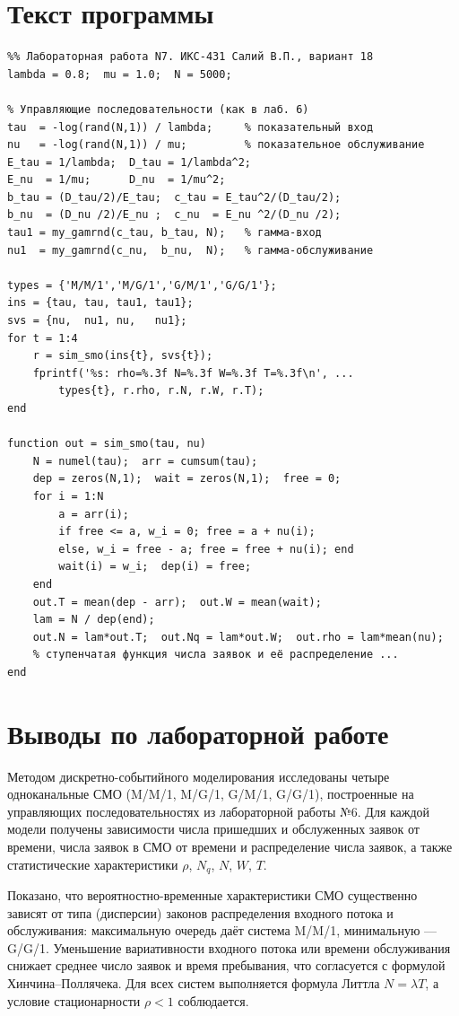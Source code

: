 \documentclass[a4paper,14pt,oneside,openany]{memoir}
\begin{document}
\section{Текст программы}
\begin{verbatim}
%% Лабораторная работа N7. ИКС-431 Салий В.П., вариант 18
lambda = 0.8;  mu = 1.0;  N = 5000;

% Управляющие последовательности (как в лаб. 6)
tau  = -log(rand(N,1)) / lambda;     % показательный вход
nu   = -log(rand(N,1)) / mu;         % показательное обслуживание
E_tau = 1/lambda;  D_tau = 1/lambda^2;
E_nu  = 1/mu;      D_nu  = 1/mu^2;
b_tau = (D_tau/2)/E_tau;  c_tau = E_tau^2/(D_tau/2);
b_nu  = (D_nu /2)/E_nu ;  c_nu  = E_nu ^2/(D_nu /2);
tau1 = my_gamrnd(c_tau, b_tau, N);   % гамма-вход
nu1  = my_gamrnd(c_nu,  b_nu,  N);   % гамма-обслуживание

types = {'M/M/1','M/G/1','G/M/1','G/G/1'};
ins = {tau, tau, tau1, tau1};
svs = {nu,  nu1, nu,   nu1};
for t = 1:4
    r = sim_smo(ins{t}, svs{t});
    fprintf('%s: rho=%.3f N=%.3f W=%.3f T=%.3f\n', ...
        types{t}, r.rho, r.N, r.W, r.T);
end

function out = sim_smo(tau, nu)
    N = numel(tau);  arr = cumsum(tau);
    dep = zeros(N,1);  wait = zeros(N,1);  free = 0;
    for i = 1:N
        a = arr(i);
        if free <= a, w_i = 0; free = a + nu(i);
        else, w_i = free - a; free = free + nu(i); end
        wait(i) = w_i;  dep(i) = free;
    end
    out.T = mean(dep - arr);  out.W = mean(wait);
    lam = N / dep(end);
    out.N = lam*out.T;  out.Nq = lam*out.W;  out.rho = lam*mean(nu);
    % ступенчатая функция числа заявок и её распределение ...
end
\end{verbatim}

\section*{Выводы по лабораторной работе}
Методом дискретно-событийного моделирования исследованы четыре одноканальные СМО (M/M/1, M/G/1, G/M/1, G/G/1), построенные на управляющих последовательностях из лабораторной работы №6. Для каждой модели получены зависимости числа пришедших и обслуженных заявок от времени, числа заявок в СМО от времени и распределение числа заявок, а также статистические характеристики $\rho$, $N_q$, $N$, $W$, $T$.

Показано, что вероятностно-временные характеристики СМО существенно зависят от типа (дисперсии) законов распределения входного потока и обслуживания: максимальную очередь даёт система M/M/1, минимальную --- G/G/1. Уменьшение вариативности входного потока или времени обслуживания снижает среднее число заявок и время пребывания, что согласуется с формулой Хинчина--Поллячека. Для всех систем выполняется формула Литтла $N=\lambda T$, а условие стационарности $\rho<1$ соблюдается.
\end{document}
